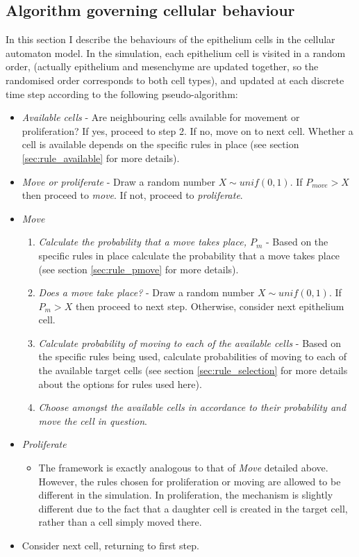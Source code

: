 \documentclass[pdftex,10pt,a4paper]{article}
\begin{document}
\subsection{Algorithm governing cellular behaviour}
In this section I describe the behaviours of the epithelium cells in the cellular automaton model. In the simulation, each epithelium cell is visited in a random order, (actually epithelium and mesenchyme are updated together, so the randomised order corresponds to both cell types), and updated at each discrete time step according to the following pseudo-algorithm:

\begin{itemize}
\item \textit{Available cells} - Are neighbouring cells available for movement or proliferation? If yes, proceed to step 2. If no, move on to next cell. Whether a cell is available depends on the specific rules in place (see section \ref{sec:rule_available} for more details).
\item \textit{Move or proliferate} - Draw a random number $X\sim unif(0,1)$. If $P_{move}>X$ then proceed to \textit{move}. If not, proceed to \textit{proliferate}.
\item \textit{Move} 
\begin{enumerate}
\item \textit{Calculate the probability that a move takes place, $P_m$} - Based on the specific rules in place calculate the probability that a move takes place (see section \ref{sec:rule_pmove} for more details).
\item \textit{Does a move take place?} - Draw a random number $X\sim unif(0,1)$. If $P_{m}>X$ then proceed to next step. Otherwise, consider next epithelium cell.
\item \textit{Calculate probability of moving to each of the available cells} - Based on the specific rules being used, calculate probabilities of moving to each of the available target cells (see section \ref{sec:rule_selection} for more details about the options for rules used here). 
\item \textit{Choose amongst the available cells in accordance to their probability and move the cell in question}.
\end{enumerate} 
\item \textit{Proliferate}
\begin{itemize}
\item The framework is exactly analogous to that of \textit{Move} detailed above. However, the rules chosen for proliferation or moving are allowed to be different in the simulation. In proliferation, the mechanism is slightly different due to the fact that a daughter cell is created in the target cell, rather than a cell simply moved there.
\end{itemize}
\item Consider next cell, returning to first step.
\end{itemize}
\end{document}
